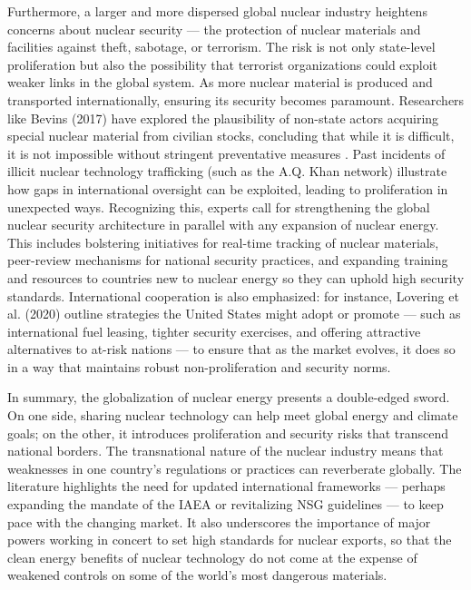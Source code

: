 \documentclass[11,5 pt]{article}
\begin{document}
Furthermore, a larger and more dispersed global nuclear industry heightens concerns about nuclear security — the protection of nuclear materials and facilities against theft, sabotage, or terrorism. The risk is not only state-level proliferation but also the possibility that terrorist organizations could exploit weaker links in the global system. As more nuclear material is produced and transported internationally, ensuring its security becomes paramount. Researchers like Bevins (2017) have explored the plausibility of non-state actors acquiring special nuclear material from civilian stocks, concluding that while it is difficult, it is not impossible without stringent preventative measures \cite{bevins2017alternate}. Past incidents of illicit nuclear technology trafficking (such as the A.Q. Khan network) illustrate how gaps in international oversight can be exploited, leading to proliferation in unexpected ways. Recognizing this, experts call for strengthening the global nuclear security architecture in parallel with any expansion of nuclear energy. This includes bolstering initiatives for real-time tracking of nuclear materials, peer-review mechanisms for national security practices, and expanding training and resources to countries new to nuclear energy so they can uphold high security standards. International cooperation is also emphasized: for instance, Lovering et al. (2020) outline strategies the United States might adopt or promote — such as international fuel leasing, tighter security exercises, and offering attractive alternatives to at-risk nations — to ensure that as the market evolves, it does so in a way that maintains robust non-proliferation and security norms.

In summary, the globalization of nuclear energy presents a double-edged sword. On one side, sharing nuclear technology can help meet global energy and climate goals; on the other, it introduces proliferation and security risks that transcend national borders. The transnational nature of the nuclear industry means that weaknesses in one country’s regulations or practices can reverberate globally. The literature highlights the need for updated international frameworks — perhaps expanding the mandate of the IAEA or revitalizing NSG guidelines — to keep pace with the changing market. It also underscores the importance of major powers working in concert to set high standards for nuclear exports, so that the clean energy benefits of nuclear technology do not come at the expense of weakened controls on some of the world’s most dangerous materials.
\end{document}
